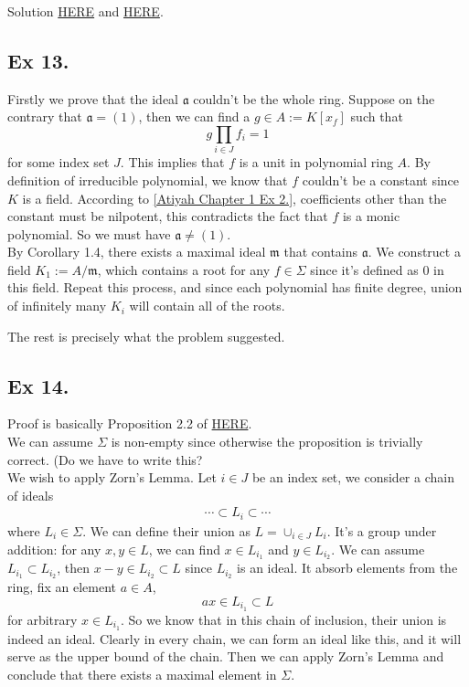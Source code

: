 Solution \href{https://math.stackexchange.com/questions/3180861/proof-check-idempotents-of-a-local-commutative-ring}{HERE} and \href{https://math.stackexchange.com/questions/725171/idempotents-in-a-local-ring}{HERE}.



\subsection{Ex 13.}

\indent Firstly we prove that the ideal $\mathfrak a$ couldn't be the whole ring. Suppose on the contrary that $\mathfrak a=(1)$, then we can find a $g\in A:=K[x_f]$ such that 
$$g\prod_{i\in J}f_i=1$$ for some index set $J$. This implies that $f$ is a unit in polynomial ring $A$. By definition of irreducible polynomial, we know that $f$ couldn't be a constant since $K$ is a field. According to \ref{Atiyah Chapter 1 Ex 2.}, coefficients other than the constant must be nilpotent, this contradicts the fact that $f$ is a monic polynomial. So we must have $\mathfrak a\neq (1)$.\\

By Corollary 1.4, there exists a maximal ideal $\mathfrak m$ that contains $\mathfrak a$. We construct a field $K_1:=A/\mathfrak m$, which contains a root for any $f\in \Sigma$ since it's defined as $0$ in this field. Repeat this process, and since each polynomial has finite degree, union of infinitely many $K_i$ will contain all of the roots. 

The rest is precisely what the problem suggested.



\subsection{Ex 14.}

Proof is basically Proposition 2.2 of \href{https://www.jmilne.org/math/xnotes/CA.pdf}{HERE}.\\

We can assume $\Sigma$ is non-empty since otherwise the proposition is trivially correct.  (Do we have to write this?\\

We wish to apply Zorn's Lemma. Let $i\in J$ be an index set, we consider a chain of ideals
\begin{align*}
    \cdots\subset L_i\subset \cdots
\end{align*}where $L_i\in \Sigma$. We can define their union as $L=\cup_{i\in J} L_i$. 
It's a group under addition: for any $x,y\in L$, we can find $x\in L_{i_1}$ and $y\in L_{i_2}$. We can assume $L_{i_1}\subset L_{i_2}$, then $x-y\in L_{i_2}\subset L$ since $L_{i_2}$ is an ideal. It absorb elements from the ring, fix an element $a\in A$, 
$$ax\in L_{i_1}\subset L$$ for arbitrary $x\in L_{i_1}$. So we know that in this chain of inclusion, their union is indeed an ideal. Clearly in every chain, we can form an ideal like this, and it will serve as the upper bound of the chain. Then we can apply Zorn's Lemma and conclude that there exists a maximal element in $\Sigma$.\\

